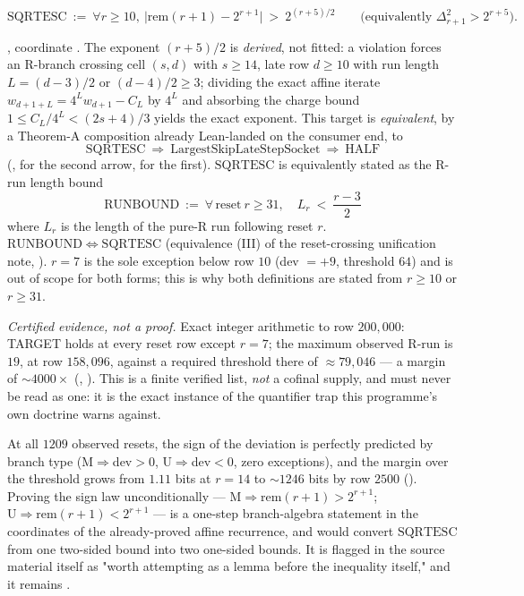 \begin{defn}
\[
\mathrm{SQRTESC}\ :=\ \forall r\ge 10,\ \big|\mathrm{rem}(r+1)-2^{r+1}\big|\ >\ 2^{(r+5)/2}
\qquad\Big(\text{equivalently } \Delta_{r+1}^2 > 2^{r+5}\Big).
\]
\end{defn}
, coordinate . The
exponent $(r+5)/2$ is \emph{derived}, not fitted: a violation forces an R-branch crossing cell
$(s,d)$ with $s\ge14$, late row $d\ge10$ with run length $L=(d-3)/2$ or $(d-4)/2\ge3$; dividing
the exact affine iterate $w_{d+1+L}=4^Lw_{d+1}-C_L$ by $4^L$ and absorbing the charge bound
$1\le C_L/4^L<(2s+4)/3$ yields the exact exponent. This target is \emph{equivalent}, by a Theorem-A
composition already Lean-landed on the consumer end, to
\[
\mathrm{SQRTESC}\ \Longrightarrow\ \mathrm{LargestSkipLateStepSocket}\ \Longrightarrow\ \mathrm{HALF}
\]
(,  for the second
arrow,  for the first). $\mathrm{SQRTESC}$ is equivalently stated as the
R-run length bound
\[
\mathrm{RUNBOUND}\ :=\ \forall\,\text{reset}\ r\ge31,\quad L_r\ <\ \frac{r-3}{2}
\]
where $L_r$ is the length of the pure-R run following reset $r$. $\mathrm{RUNBOUND}\Leftrightarrow
\mathrm{SQRTESC}$ (equivalence (III) of the reset-crossing unification note, ). $r=7$ is
the sole exception below row $10$ (dev $=+9$, threshold $64$) and is out of scope for both forms;
this is why both definitions are stated from $r\ge10$ or $r\ge31$.

\emph{Certified evidence, not a proof.} Exact integer arithmetic to row $200{,}000$: TARGET holds
at every reset row except $r=7$; the maximum observed R-run is $19$, at row $158{,}096$, against a
required threshold there of $\approx79{,}046$ --- a margin of $\sim4000\times$
(, ). This is a finite verified list, \emph{not} a cofinal supply, and must
never be read as one: it is the exact instance of the quantifier trap this programme's own
doctrine warns against.

\begin{obs}
At all $1209$ observed resets, the sign of the deviation is perfectly predicted by branch type
(M$\Rightarrow$dev$>0$, U$\Rightarrow$dev$<0$, zero exceptions), and the margin over the threshold
grows from $1.11$ bits at $r=14$ to $\sim1246$ bits by row $2500$ (). Proving the sign
law unconditionally --- $\mathrm{M}\Rightarrow \mathrm{rem}(r+1)>2^{r+1}$;
$\mathrm{U}\Rightarrow \mathrm{rem}(r+1)<2^{r+1}$ --- is a one-step branch-algebra statement in the
coordinates of the already-proved affine recurrence, and would convert $\mathrm{SQRTESC}$ from one
two-sided bound into two one-sided bounds. It is flagged in the source material itself as "worth
attempting as a lemma before the inequality itself," and it remains .
\end{obs}

